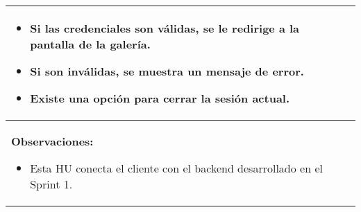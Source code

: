 \begin{table}[H]
\begin{center}
\begin{tabularx}{\textwidth}{|l|X|l|}
{\begin{itemize}
                    \item Si las credenciales son válidas, se le redirige a la pantalla de la galería.
                    \item Si son inválidas, se muestra un mensaje de error.
                    \item Existe una opción para cerrar la sesión actual.
                \end{itemize}
            }\\
            \hline
            \multicolumn{3}{|p{\textwidth}|}{
                \textbf{Observaciones:}
                \begin{itemize}
                    \item Esta HU conecta el cliente con el backend desarrollado en el Sprint 1.
                \end{itemize}
            }\\
            \hline
        \end{tabularx}
    \end{center}
\end{table}

